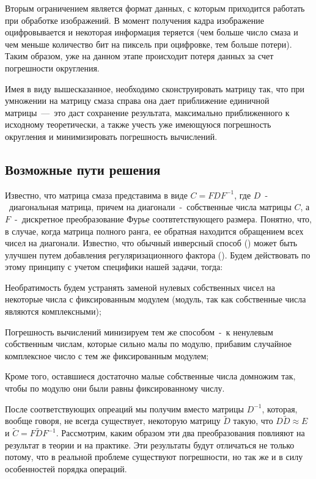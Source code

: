 \documentclass[a4paper]{article}
\theoremstyle{definition}
\newcounter{qcounter}
\begin{document}
    Вторым ограничением является формат данных, с которым приходится работать при обработке изображений. В момент получения кадра изображение оцифровывается и некоторая информация теряется (чем больше число смаза и чем меньше количество бит на пиксель при оцифровке, тем больше потери). Таким образом, уже на данном этапе происходит потеря данных за счет погрешности округления.


    Имея в виду вышесказанное, необходимо сконструировать матрицу так, что при умножении на матрицу смаза справа она дает приближение единичной матрицы~---~это даст сохранение результата, максимально приближенного к исходному теоретически, а также учесть уже имеющуюся погрешность округления и минимизировать погрешность вычислений.


    \subsection{Возможные пути решения}


    Известно, что матрица смаза представима в виде $C = FDF^{-1}$, где $D$~-~диагональная матрица, причем на диагонали~-~собственные числа матрицы $C$, а $F$~-~дискретное преобразование Фурье соотвтетствующего размера. Понятно, что, в случае, когда матрица полного ранга, ее обратная находится обращением всех чисел на диагонали. Известно, что обычный инверсный способ (\cite{model_proc}) может быть улучшен путем добавления регуляризационного фактора (\cite{addition}). Будем действовать по этому принципу с учетом специфики нашей задачи, тогда:


    \begin{list}{)~}{}
        \item Необратимость будем устранять заменой нулевых собственных чисел на некоторые числа с фиксированным модулем (модуль, так как собственные числа являются комплексными);
        \item Погрешность вычислений минизируем тем же способом~-~к ненулевым собственным числам, которые сильно малы по модулю, прибавим случайное комплексное число с тем же фиксированным модулем;
        \item Кроме того, оставшиеся достаточно малые собственные числа домножим так, чтобы по модулю они были равны фиксированному числу.
    \end{list}



    После соответствующих опреаций мы получим вместо матрицы $D^{-1}$, которая, вообще говоря, не всегда существует, некоторую матрицу $\tilde{D}$ такую, что $D\tilde{D} \approx E$ и $\tilde{C} = F\tilde{D}F^{-1}$. Рассмотрим, каким образом эти два преобразования повлияют на результат в теории и на практике. Эти результаты будут отличаться не только потому, что в реальной проблеме существуют погрешности, но так же и в силу особенностей порядка операций.
\end{document}

